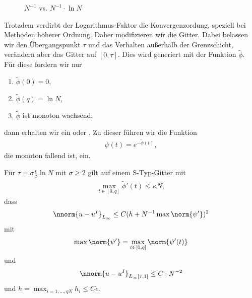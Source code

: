 \begin{figure}[ht!]
  \centering
  \caption{$N^{-1}$ vs. $N^{-1} \cdot \ln N$}
  \label{fig:log}
\end{figure}



Trotzdem verdirbt der Logarithmus-Faktor die Konvergenzordung, speziell bei Methoden höherer Ordnung. Daher modifizieren wir die Gitter. Dabei belassen wir den Übergangspunkt $\tau$ und das Verhalten außerhalb der Grenzschicht, verändern aber das Gitter auf $[0, \tau]$. Dies wird generiert mit der Funktion $\tilde\phi$. Für diese fordern wir nur
\begin{enumerate}
\item $\tilde \phi (0) = 0$, 
\item $\tilde \phi (q) = \ln N$, 
\item $\tilde \phi$ ist monoton wachsend;
\end{enumerate}
dann erhalten wir ein  oder . 
Zu dieser führen wir die  Funktion
\begin{align*}
  \psi(t) = e^{- \tilde \phi (t)}, 
\end{align*}
die monoton fallend ist, ein.
\begin{folgerung}\label{6-13}
  Für $\tau = \sigma \frac \epsilon \beta \ln N$ mit $\sigma \geq 2$ gilt auf einem S-Typ-Gitter mit
  \begin{align*}
    \max_{t \in [0, q]} \tilde \phi'(t) \leq \kappa N,
  \end{align*}
  dass
  \begin{align*}
    \nnorm{u - u^{I}}_{L_{\infty}} \leq C ( h + N^{-1} \max \norm{\psi'})^{2}  
  \end{align*}
  mit
  \begin{align*}
    \max \norm{\psi'} =   \max_{t \in [0, q]} \norm{\psi'(t)} 
  \end{align*}
  und
  \begin{align*}
    \nnorm{u - u^{I}}_{L_{\infty}[\tau, 1]} \leq C \cdot N^{-2}
  \end{align*}
  und $h = \max_{i = 1, \dots, q N} h_{i} \leq C \epsilon$.  
\end{folgerung}
